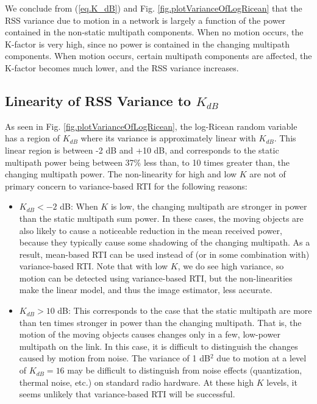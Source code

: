 \documentclass[journal]{IEEEtran}
\begin{document}
We conclude from (\ref{eq.K_dB}) and Fig. \ref{fig.plotVarianceOfLogRicean} that the RSS variance due to motion in a network is largely a function of the power contained in the non-static multipath components. When no motion occurs, the K-factor is very high, since no power is contained in the changing multipath components.  When motion occurs, certain multipath components are affected, the K-factor becomes much lower, and the RSS variance increases.

\subsection{Linearity of RSS Variance to $K_{dB}$}
As seen in Fig. \ref{fig.plotVarianceOfLogRicean}, the log-Ricean random variable has a region of $K_{dB}$ where its variance is approximately linear with $K_{dB}$. This linear region is between -2 dB and +10 dB, and corresponds to the static multipath power being between 37\% less than, to 10 times greater than, the changing multipath power. The non-linearity for high and low $K$ are not of primary concern to variance-based RTI for the following reasons:
\begin{itemize}
\item $K_{dB}<-2$ dB: When $K$ is low, the changing multipath are stronger in power than the static multipath sum power.  In these cases, the moving objects are also likely to cause a noticeable reduction in the mean received power, because they typically cause some shadowing of the changing multipath.  As a result, mean-based RTI can be used instead of (or in some combination with) variance-based RTI.  Note that with low $K$, we do see high variance, so motion can be detected using variance-based RTI, but the non-linearities make the linear model, and thus the image estimator, less accurate.
\item $K_{dB}>10$ dB: This corresponds to the case that the static multipath are more than ten times stronger in power than the changing multipath.  That is, the motion of the moving objects causes changes only in a few, low-power multipath on the link.  In this case, it is difficult to distinguish the changes caused by motion from noise.  The variance of 1 dB$^2$ due to motion at a level of $K_{dB}=16$ may be difficult to distinguish from noise effects (quantization, thermal noise, etc.) on standard radio hardware.  At these high $K$ levels, it seems unlikely that variance-based RTI will be successful.
\end{itemize}
\end{document}

